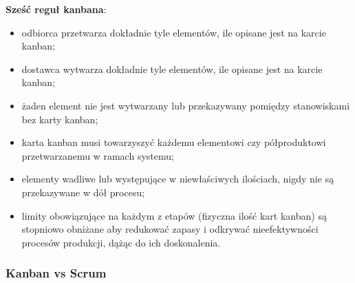 \documentclass[../main.tex]{subfiles}
\begin{document}
    \textbf{Sześć reguł kanbana}:
    \begin{itemize}
        \item odbiorca przetwarza dokładnie tyle elementów, ile opisane
        jest na karcie kanban;
        \item dostawca wytwarza dokładnie tyle elementów, ile opisane jest
        na karcie kanban;
        \item żaden element nie jest wytwarzany lub przekazywany
        pomiędzy stanowiskami bez karty kanban;
        \item karta kanban musi towarzyszyć każdemu elementowi czy
        półproduktowi przetwarzanemu w ramach systemu;
        \item elementy wadliwe lub występujące w niewłaściwych ilościach,
        nigdy nie są przekazywane w dół procesu;
        \item limity obowiązujące na każdym z etapów (fizyczna ilość kart
        kanban) są stopniowo obniżane aby redukować zapasy i
        odkrywać nieefektywności procesów produkcji, dążąc do ich
        doskonalenia.
    \end{itemize}

    \subsubsection{Kanban vs Scrum}
\end{document}
